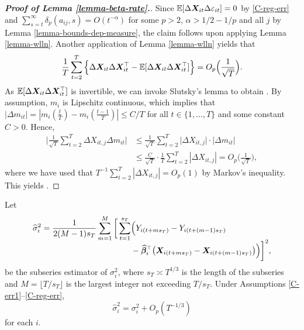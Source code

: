 \documentclass[12pt]{article}
\makeatletter
\renewcommand{\eqref}[1]{\tagform@{\ref{#1}}}
\makeatother
\begin{document}
\begin{proof}[\textnormal{\textbf{Proof of Lemma \ref{lemma-beta-rate}.}}]
Since $\mathbb{E}[\Delta \boldsymbol{X}_{it} \Delta \varepsilon_{it}] = 0$ by \ref{C-reg-err} and $\sum_{s=t}^\infty \delta_p(a_{ij}, s) = O(t^{-\alpha})$ for some $p > 2$, $\alpha > 1/2 - 1/p$ and all $j$ by Lemma \ref{lemma-bounds-dep-measure}, the claim \eqref{lemma-beta-rate-claim1} follows upon applying Lemma \ref{lemma-wlln}. Another application of Lemma \ref{lemma-wlln} yields that 
\[ \frac{1}{T}\sum_{t=2}^T \Big\{ \Delta \boldsymbol{X}_{it} \Delta \boldsymbol{X}_{it}^\top - \mathbb{E}[\Delta \boldsymbol{X}_{it} \Delta \boldsymbol{X}_{it}^\top] \Big\} = O_p\Big(\frac{1}{\sqrt{T}}\Big). \]
As $\mathbb{E}[\Delta \boldsymbol{X}_{it} \Delta \boldsymbol{X}_{it}^\top]$ is invertible, we can invoke Slutsky's lemma to obtain \eqref{lemma-beta-rate-claim2}. By assumption, $m_i$ is Lipschitz continuous, which implies that $|\Delta m_{it}| = |m_i (\frac{t}{T}) - m_i (\frac{t-1}{T}) | \leq C/T$ for all $t \in \{1, \ldots, T\}$ and some constant $C > 0$. Hence, 
\begin{align*}
\Big| \frac{1}{\sqrt{T}}\sum_{t=2}^T \Delta X_{it,j} \Delta m_{it}\Big| &\leq \frac{1}{\sqrt{T}}\sum_{t=2}^T \big|\Delta X_{it,j} \big| \cdot \big| \Delta m_{it} \big| \\
	& \leq \frac{C}{\sqrt{T}} \cdot \frac{1}{T} \sum_{t=2}^T \left|\Delta X_{it,j} \right| = O_p\Big(\frac{1}{\sqrt{T}}\Big),
\end{align*}
where we have used that $T^{-1} \sum_{t=2}^T |\Delta X_{it,j}| = O_p(1)$ by Markov's inequality. This yields \eqref{lemma-beta-rate-claim3}.
\end{proof}


\begin{lemmaA}\label{lemmaA:lrv}
Let
\begin{align*}
\widehat{\sigma}_i^2 = \frac{1}{2(M-1)s_T}\sum_{m=1}^M \bigg[ \sum_{t = 1}^{s_T} & \Big(Y_{i(t + ms_T)} - Y_{i(t + (m-1)s_T)} \\[-0.2cm] & - \widehat{\bm{\beta}}_i^\top\big(\boldsymbol{X}_{i(t+ms_T)} - \boldsymbol{X}_{i(t+(m-1)s_T)}\big) \Big)\bigg]^2, 
\end{align*}
be the subseries estimator of $\sigma_i^2$, where $s_T \asymp T^{1/3}$ is the length of the subseries and $M = \lfloor T/s_T\rfloor$ is the largest integer not exceeding $T/s_T$. Under Assumptions \ref{C-err1}--\ref{C-reg-err}, 
$$\widehat{\sigma}_i^2 = \sigma_i^2 + O_p(T^{-1/3})$$
for each $i$.
\end{lemmaA}
\end{document}
